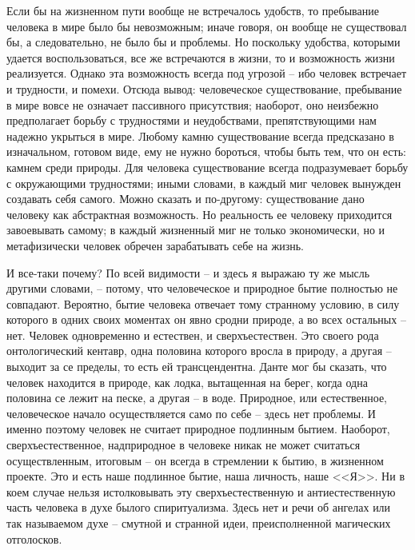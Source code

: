 Если бы на жизненном пути вообще не встречалось удобств, то пребывание 
человека в мире было бы невозможным; иначе говоря, он вообще не существовал 
бы, а следовательно, не было бы и проблемы. Но поскольку удобства, которыми 
удается воспользоваться, все же встречаются в жизни, то и возможность жизни 
реализуется. Однако эта возможность всегда под угрозой -- ибо человек 
встречает и трудности, и помехи. Отсюда вывод: человеческое существование, 
пребывание в мире вовсе не означает пассивного присутствия; наоборот, оно 
неизбежно предполагает борьбу с трудностями и неудобствами, препятствующими 
нам надежно укрыться в мире. Любому камню существование всегда предсказано в 
изначальном, готовом виде, ему не нужно бороться, чтобы быть тем, что он есть: 
камнем среди природы. Для человека существование всегда подразумевает борьбу с 
окружающими трудностями; иными словами, в каждый миг человек вынужден 
создавать себя самого. Можно сказать и по-другому: существование дано человеку 
как абстрактная возможность. Но реальность ее человеку приходится завоевывать 
самому; в каждый жизненный миг не только экономически, но и метафизически 
человек обречен зарабатывать себе на жизнь.

И все-таки почему? По всей видимости -- и здесь я выражаю ту же мысль другими 
словами, -- потому, что человеческое и природное бытие полностью не совпадают. 
Вероятно, бытие человека отвечает тому странному условию, в силу которого в 
одних своих моментах он явно сродни природе, а во всех остальных -- нет. 
Человек одновременно и естествен, и сверхъестествен. Это своего рода 
онтологический кентавр, одна половина которого вросла в природу, а другая -- 
выходит за се пределы, то есть ей трансцендентна. Данте мог бы сказать, что 
человек находится в природе, как лодка, вытащенная на берег, когда одна 
половина се лежит на песке, а другая -- в воде. Природное, или естественное, 
человеческое начало осуществляется само по себе -- здесь нет проблемы. И 
именно поэтому человек не считает природное подлинным бытием. Наоборот, 
сверхъестественное, надприродное в человеке никак не может считаться 
осуществленным, итоговым -- он всегда в стремлении к бытию, в жизненном 
проекте. Это и есть наше подлинное бытие, наша личность, наше <<Я>>. Ни в 
коем случае нельзя истолковывать эту сверхъестественную и антиестественную 
часть человека в духе былого спиритуализма. Здесь нет и речи об ангелах или 
так называемом духе -- смутной и странной идеи, преисполненной магических 
отголосков.

